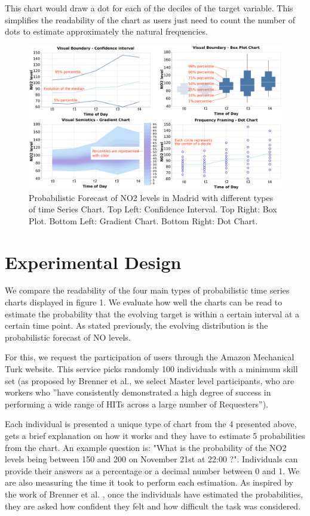 \documentclass[a4paper,3p,sort&compress]{elsarticle}
\begin{document}
This chart would draw a dot for each of the deciles of the target variable. This simplifies the 
readability of the chart as users just need to count the number of dots to estimate approximately 
the natural frequencies.



\begin{figure}
  \centering
  \includegraphics[width=.9\textwidth]{charts_vector} 
  \caption{\label{figure:charts} Probabilistic Forecast of NO2 levels in Madrid with different types of time Series Chart. 
  Top Left: Confidence Interval. Top Right: Box Plot. 
  Bottom Left: Gradient Chart. Bottom Right: Dot Chart.  }
\end{figure}

\section{Experimental Design}
\label{sec:exp_design}

We compare the readability of the four main types of probabilistic time series charts 
displayed in figure 1. We evaluate how well the charts can be read to estimate the probability 
that the evolving target is within a certain interval at a certain time point. As stated previously, 
the evolving distribution is the probabilistic forecast of NO levels. 

For this, we request the participation of users through the Amazon Mechanical Turk website. 
This service picks randomly 100 individuals with a minimum skill set (as proposed by Brenner 
et al., we select Master level participants, who are workers who 
''have consistently demonstrated a high degree of success in performing a wide range of HITs across a large number of Requesters'').

Each individual is presented a unique type of chart from the 4 presented above, gets a brief 
explanation on how it works and they have to estimate 5 probabilities from the chart. An example question is: 
"What is the probability of the NO2 levels being between 150 and 200 on 
November 21st at 22:00 ?". Individuals can provide their answers as a percentage or a 
decimal number between 0
and 1. We are also measuring the time it took to perform each estimation. 
As inspired by the work of Brenner et 
al. , once the individuals have estimated the probabilities, they are asked how confident they 
felt and how difficult the task was considered.
\end{document}
